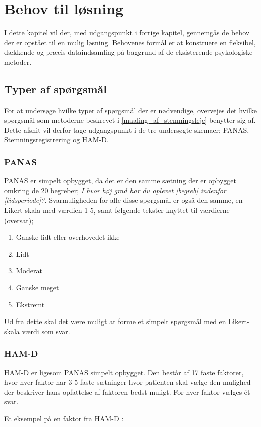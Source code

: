 \chapter{Behov til løsning}\label{krav}
I dette kapitel vil der, med udgangspunkt i forrige kapitel, gennemgås de behov der er opstået til en mulig løsning.
Behovenes formål er at konstruere en fleksibel, dækkende og præcis dataindsamling på baggrund af de eksisterende psykologiske metoder.

\section{Typer af spørgsmål}
For at undersøge hvilke typer af spørgsmål der er nødvendige, overvejes det hvilke spørgsmål som metoderne beskrevet i \cref{maaling_af_stemningsleje} benytter sig af.
Dette afsnit vil derfor tage udgangspunkt i de tre undersøgte skemaer; PANAS, Stemningsregistrering og HAM-D.

\subsection{PANAS} 
PANAS er simpelt opbygget, da det er den samme sætning der er opbygget omkring de 20 begreber; \textit{I hvor høj grad har du oplevet [begreb] indenfor [tidsperiode]?}.
Svarmuligheden for alle disse spørgsmål er også den samme, en Likert-skala\cite{likert} med værdien 1-5, samt følgende tekster knyttet til værdierne (oversat);
\begin{enumerate}
\item Ganske lidt eller overhovedet ikke
\item Lidt
\item Moderat
\item Ganske meget
\item Ekstremt
\end{enumerate}

Ud fra dette skal det være muligt at forme et simpelt spørgsmål med en Likert-skala værdi som svar.

\subsection{HAM-D} 
HAM-D er ligesom PANAS simpelt opbygget.
Den består af 17 faste faktorer, hvor hver faktor har 3-5 faste sætninger hvor patienten skal vælge den mulighed der beskriver hans opfattelse af faktoren bedst muligt.
For hver faktor vælges ét svar.

Et eksempel på en faktor fra HAM-D \cite{ham_d}:\\

